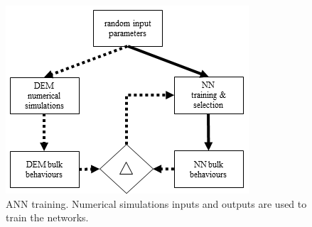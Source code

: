 \begin{figure}[!htb]
\centering
\includegraphics[width=.50\columnwidth]{images/127anntraining}
\caption[ANN training]{ANN training. Numerical simulations inputs and outputs
are used to train the networks.}
\label{fig:127anntraining}
\end{figure}